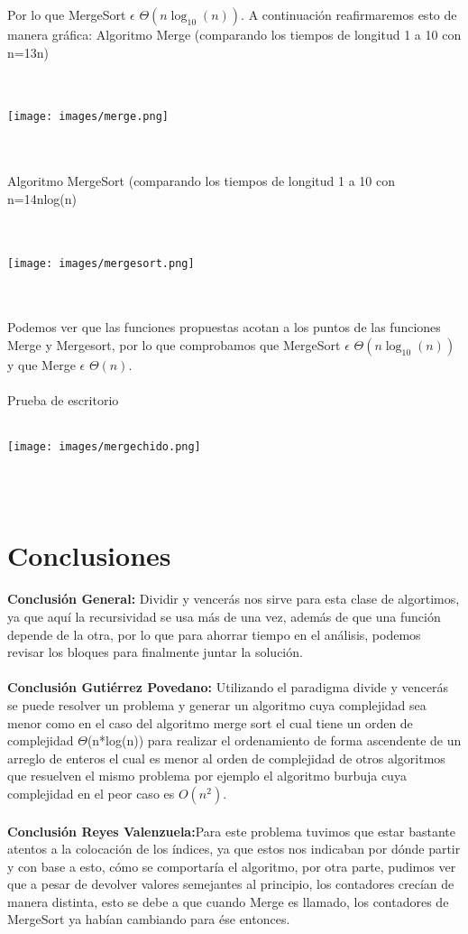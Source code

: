 \documentclass[12pt,twoside]{article}
\begin{document}
Por lo que MergeSort $\epsilon$ $\Theta(n\log_{10}(n))$.
A continuaci\'on reafirmaremos esto de manera gr\'afica:
Algoritmo Merge (comparando los tiempos de longitud 1 a 10 con n=13n)\\\\\
\centerline{\texttt{[image: images/merge.png]}}\\\\\newpage
Algoritmo MergeSort (comparando los tiempos de longitud 1 a 10 con n=14nlog(n)\\\\\
\centerline{\texttt{[image: images/mergesort.png]}}\\\\
Podemos ver que las funciones propuestas acotan a los puntos de las funciones Merge y Mergesort, por lo que comprobamos que MergeSort $\epsilon$ $\Theta(n\log_{10}(n))$ y que Merge $\epsilon$ $\Theta(n)$.\\\\
Prueba de escritorio\\\\
\centerline{\texttt{[image: images/mergechido.png]}}\\\\\newpage
\section{Conclusiones}
\textbf{Conclusi\'on General: }Dividir y vencer\'as nos sirve para esta clase de algortimos, ya que aquí la recursividad se usa m\'as de una vez, adem\'as de que una funci\'on depende de la otra, por lo que para ahorrar tiempo en el an\'alisis, podemos revisar los bloques para finalmente juntar la soluci\'on.\\\\
\textbf{Conclusi\'on Guti\'errez Povedano: }Utilizando el paradigma divide y vencerás se puede resolver un problema y generar un algoritmo cuya complejidad sea menor como en el caso del algoritmo merge sort el cual tiene un orden de complejidad $\Theta$(n*log(n)) para realizar el ordenamiento de forma ascendente de un arreglo de enteros el cual es menor al orden de complejidad de otros algoritmos que resuelven el mismo problema por ejemplo el algoritmo burbuja cuya complejidad en el peor caso es $O(n^{2})$.\\\\
\textbf{Conclusi\'on Reyes Valenzuela:}Para este problema tuvimos que estar bastante atentos a la colocaci\'on de los \'indices, ya que estos nos indicaban por d\'onde partir y con base a esto, c\'omo se comportar\'ia el algoritmo, por otra parte, pudimos ver que a pesar de devolver valores semejantes al principio, los contadores crec\'ian de manera distinta, esto se debe a que cuando Merge es llamado, los contadores de MergeSort ya hab\'ian cambiando para \'ese entonces.\\\\
\end{document}
